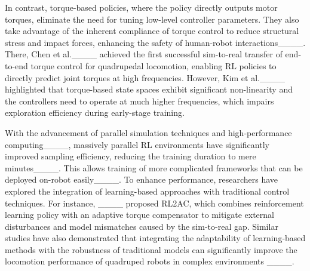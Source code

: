 In contrast, torque-based policies, where the policy directly outputs motor torques, eliminate the need for tuning low-level controller parameters.
They also take advantage of the inherent compliance of torque control to reduce structural stress and impact forces, enhancing the safety of human-robot interactions____.
There, Chen et al.____ achieved the first successful sim-to-real transfer of end-to-end torque control for quadrupedal locomotion, enabling RL policies to directly predict joint torques at high frequencies.
However, Kim et al.____ highlighted that torque-based state spaces exhibit significant non-linearity and the controllers need to operate at much higher frequencies, which impairs exploration efficiency during early-stage training.

With the advancement of parallel simulation techniques and high-performance computing____, massively parallel RL environments have significantly improved sampling efficiency, reducing the training duration to mere minutes____.
This allows training of more complicated frameworks that can be deployed on-robot easily____.
To enhance performance, researchers have explored the integration of learning-based approaches with traditional control techniques. For instance, ____ proposed RL2AC, which combines reinforcement learning policy with an adaptive torque compensator to mitigate external disturbances and model mismatches caused by the sim-to-real gap.
Similar studies have also demonstrated that integrating the adaptability of learning-based methods with the robustness of traditional models can significantly improve the locomotion performance of quadruped robots in complex environments ____.

